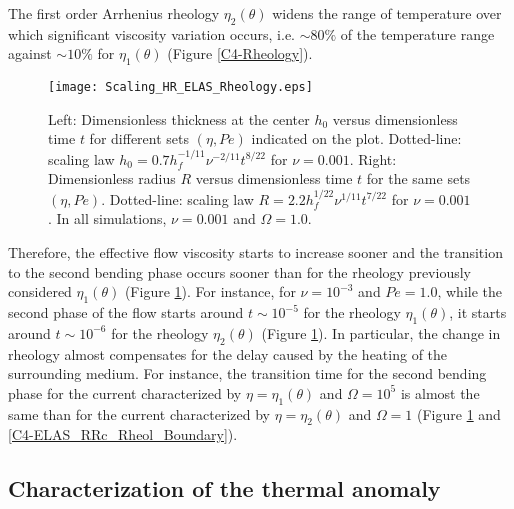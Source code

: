 The first  order Arrhenius rheology $\eta_2(\theta)$  widens the range
of temperature over which significant viscosity variation occurs, i.e.
$\sim80\%$   of  the   temperature   range   against  $\sim10\%$   for
$\eta_1(\theta)$ (Figure \ref{C4-Rheology}).

\begin{figure}[htpb]
  \begin{center}
    \graphicspath{ {/Users/thorey/Documents/These/Projet/Refroidissement/Skin_Model/Figure/Figure_Heating/} }
    \texttt{[image: Scaling\_HR\_ELAS\_Rheology.eps]}
    \caption{Left: Dimensionless thickness at  the center $h_0$ versus
      dimensionless time $t$ for  different sets $(\eta,Pe)$ indicated
      on      the      plot.        Dotted-line:      scaling      law
      $h_0=  0.7h_f^{-1/11}\nu^{-2/11}t^{8/22}$  for  $\nu  =  0.001$.
      Right: Dimensionless  radius $R$  versus dimensionless  time $t$
      for  the  same  sets   $(\eta,Pe)$.   Dotted-line:  scaling  law
      $R=  2.2h_f^{1/22}\nu^{1/11}t^{7/22}$  for $\nu=0.001$.  In  all
      simulations, $\nu=0.001$ and  $\Omega=1.0$.}
    \label{C4-Scaling_HR_ELAS_Rheology}
  \end{center}
\end{figure}

Therefore, the effective flow viscosity  starts to increase sooner and
the transition to the second bending  phase occurs sooner than for the
rheology     previously     considered    $\eta_1(\theta)$     (Figure
\ref{C4-Scaling_HR_ELAS_Rheology}).   For instance,  for $\nu=10^{-3}$
and  $Pe=1.0$,  while the  second  phase  of  the flow  starts  around
$t\sim 10^{-5}$  for the  rheology $\eta_1(\theta)$, it  starts around
$t\sim   10^{-6}$   for    the   rheology   $\eta_2(\theta)$   (Figure
\ref{C4-Scaling_HR_ELAS_Rheology}).   In  particular,  the  change  in
rheology almost compensates for the delay caused by the heating of the
surrounding medium. For  instance, the transition time  for the second
bending phase  for the current characterized  by $\eta=\eta_1(\theta)$
and  $\Omega=10^5$   is  almost   the  same   than  for   the  current
characterized   by   $\eta=\eta_2(\theta)$  and   $\Omega=1$   (Figure
\ref{C4-Scaling_HR_ELAS_Rheology}                                  and
\ref{C4-ELAS_RRc_Rheol_Boundary}).

\subsection{Characterization of the thermal anomaly}
\label{C4-sec:char-therm-anom}

